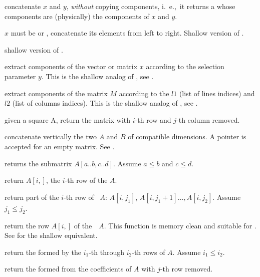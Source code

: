  concatenate $x$ and $y$, \emph{without}
copying components, i.~e.,~it returns a  whose components are
(physically) the components of $x$ and $y$.

$x$ must be  or , concatenate
its elements from left to right. Shallow version of .

 shallow version of .

 extract components
of the vector or matrix $x$ according to the selection parameter $y$.
This is the shallow analog of , see .

 extract components of the
matrix $M$ according to the  $l1$ (list of lines indices) and
$l2$ (list of columns indices).
This is the shallow analog of , see .

 given a square  A,
return the matrix with $i$-th row and $j$-th column removed.

 concatenate vertically the two  $A$
and $B$ of compatible dimensions. A  pointer is accepted for an
empty matrix. See .

returns the submatrix $A[a..b,c..d]$. Assume $a \leq b$ and  $c \leq d$.

 return $A[i,]$, the $i$-th row of the 
$A$.

 return part of the $i$-th
row of ~$A$: $A[i,j_1]$, $A[i,j_1+1]\dots,A[i,j_2]$. Assume $j_1
\leq j_2$.

 return the row $A[i,]$ of
the~~$A$. This function is memory clean and suitable for
. See  for the shallow equivalent.

 return the 
formed by the $i_1$-th through $i_2$-th rows of  $A$. Assume $i_1
\leq i_2$.

 return the  formed from the
coefficients of  $A$ with $j$-th row removed.

